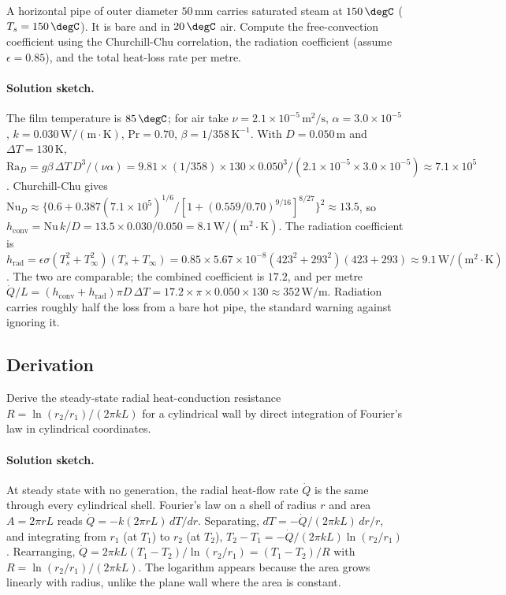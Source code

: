\begin{exercise}
A horizontal pipe of outer diameter $50\,\si{\milli\meter}$ carries
saturated steam at $150\,\degC$ ($T_s = 150\,\degC$). It is bare and
in $20\,\degC$ air. Compute the free-convection coefficient using the
Churchill-Chu correlation, the radiation coefficient (assume
$\epsilon = 0.85$), and the total heat-loss rate per metre.
\paragraph{Solution sketch.} The film temperature is $85\,\degC$; for
air take $\nu = 2.1\times10^{-5}\,\text{m}^2/\text{s}$, $\alpha =
3.0\times10^{-5}$, $k = 0.030\,\text{W}/(\text{m}\cdot\si{\kelvin})$,
$\text{Pr} = 0.70$, $\beta = 1/358\,\si{\kelvin}^{-1}$. With $D =
0.050\,\text{m}$ and $\Delta T = 130\,\si{\kelvin}$, $\text{Ra}_D =
g\beta\,\Delta T\,D^3/(\nu\alpha) = 9.81 \times (1/358) \times 130
\times 0.050^3/(2.1\times10^{-5}\times3.0\times10^{-5}) \approx 7.1
\times10^5$. Churchill-Chu gives $\text{Nu}_D \approx \{0.6 + 0.387
(7.1\times10^5)^{1/6}/[1+(0.559/0.70)^{9/16}]^{8/27}\}^2 \approx 13.5$,
so $h_{\text{conv}} = \text{Nu}\,k/D = 13.5 \times 0.030/0.050 = 8.1\,
\text{W}/(\text{m}^2\cdot\si{\kelvin})$. The radiation coefficient is
$h_{\text{rad}} = \epsilon\sigma(T_s^2+T_\infty^2)(T_s+T_\infty) = 0.85
\times 5.67\times10^{-8}(423^2+293^2)(423+293) \approx 9.1\,\text{W}/
(\text{m}^2\cdot\si{\kelvin})$. The two are comparable; the combined
coefficient is $17.2$, and per metre $\dot{Q}/L = (h_{\text{conv}} +
h_{\text{rad}})\pi D\,\Delta T = 17.2 \times \pi \times 0.050 \times
130 \approx 352\,\text{W}/\text{m}$. Radiation carries roughly half the
loss from a bare hot pipe, the standard warning against ignoring it.
\end{exercise}

\subsection*{Derivation}

\begin{exercise}
Derive the steady-state radial heat-conduction resistance $R = \ln
(r_2/r_1)/(2\pi k L)$ for a cylindrical wall by direct integration of
Fourier's law in cylindrical coordinates.
\paragraph{Solution sketch.} At steady state with no generation, the
radial heat-flow rate $\dot{Q}$ is the same through every cylindrical
shell. Fourier's law on a shell of radius $r$ and area $A = 2\pi r L$
reads $\dot{Q} = -k(2\pi r L)\,dT/dr$. Separating, $dT = -\dot{Q}/(2\pi
k L)\,dr/r$, and integrating from $r_1$ (at $T_1$) to $r_2$ (at $T_2$),
$T_2 - T_1 = -\dot{Q}/(2\pi k L)\ln(r_2/r_1)$. Rearranging, $\dot{Q} =
2\pi k L(T_1 - T_2)/\ln(r_2/r_1) = (T_1 - T_2)/R$ with $R = \ln(r_2/r_1)
/(2\pi k L)$. The logarithm appears because the area grows linearly with
radius, unlike the plane wall where the area is constant.
\end{exercise}

